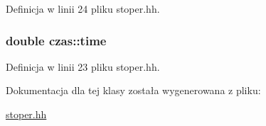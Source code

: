 \-Definicja w linii 24 pliku stoper.\-hh.

\hypertarget{classczas_a1348fd4948270410b3087bb0318bd147}{
\subsubsection[{time}]{\setlength{\rightskip}{0pt plus 5cm}double {\bf czas\-::time}}}\label{classczas_a1348fd4948270410b3087bb0318bd147}


\-Definicja w linii 23 pliku stoper.\-hh.



\-Dokumentacja dla tej klasy została wygenerowana z pliku\-:\begin{DoxyCompactItemize}
\item 
\hyperlink{stoper_8hh}{stoper.\-hh}\end{DoxyCompactItemize}
